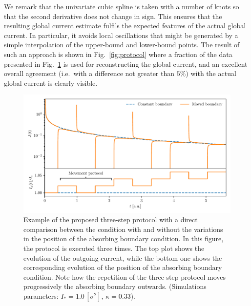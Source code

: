 We remark that the univariate cubic spline is taken with a number of knots so that the second derivative does not change in sign. This ensures that the resulting global current estimate fulfils the expected features of the actual global current. In particular, it avoids local oscillations that might be generated by a simple interpolation of the upper-bound and lower-bound points. The result of such an approach is shown in Fig.~\ref{fig:protocol} where a fraction of the data presented in Fig.~\ref{fig:9} is used for reconstructing the global current, and an excellent overall agreement  {(i.e.\ with a difference not greater than $5\%$)} with the actual global current is clearly visible.
%
\begin{figure}[t]
    \centering
    \includegraphics[width=\textwidth]{4_probing_the_diffusive_behavior/figs/final/the_protocol.pdf}
    \caption{Example of the proposed three-step protocol with a direct comparison between the condition with and without the variations in the position of the absorbing boundary condition. In this figure, the protocol is executed three times. The top plot shows the evolution of the outgoing current, while the bottom one shows the corresponding evolution of the position of the absorbing boundary condition. Note how the repetition of the three-step protocol moves progressively the absorbing boundary outwards. (Simulations parameters: $I_\ast = 1.0\,[\sigma^2],\,\kappa = 0.33$).}
    \label{fig:9}
\end{figure}
%
